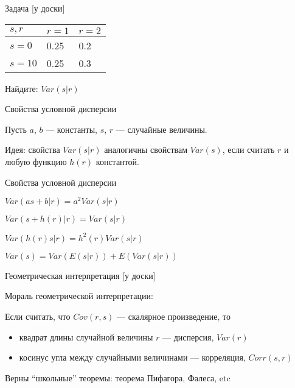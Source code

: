 \documentclass[russian,ignorenonframetext,]{beamer}
\begin{document}
\begin{frame}{Задача {[}у доски{]}}

\begin{longtable}[c]{@{}lll@{}}
\toprule
\(s,r\) & \(r=1\) & \(r=2\)\tabularnewline
\midrule
\endhead
\(s=0\) & 0.25 & 0.2\tabularnewline
\(s=10\) & 0.25 & 0.3\tabularnewline
\bottomrule
\end{longtable}

Найдите: \(Var(s|r)\)

\end{frame}

\begin{frame}{Свойства условной дисперсии}

Пусть \(a\), \(b\) --- константы, \(s\), \(r\) --- случайные величины.

Идея: свойства \(Var(s|r)\) аналогичны свойствам \(Var(s)\), если
считать \(r\) и любую функцию \(h(r)\) константой.

\end{frame}

\begin{frame}{Свойства условной дисперсии}

\(Var(as+b|r)=a^2Var(s|r)\)

\(Var(s+h(r)|r)=Var(s|r)\)

\(Var(h(r)s|r)=h^2(r)Var(s|r)\)

\(Var(s)=Var(E(s|r))+E(Var(s|r))\)

\end{frame}

\begin{frame}{Геометрическая интерпретация {[}у доски{]}}

\begin{figure}
\end{figure}

\end{frame}

\begin{frame}{Мораль геометрической интерпретации:}

Если считать, что \(Cov(r,s)\) --- скалярное произведение, то

\begin{itemize}
\item
  квадрат длины случайной величины \(r\) --- дисперсия, \(Var(r)\)
\item
  косинус угла между случайными величинами --- корреляция, \(Corr(s,r)\)
\end{itemize}

Верны ``школьные'' теоремы: теорема Пифагора, Фалеса, etc

\end{frame}
\end{document}

